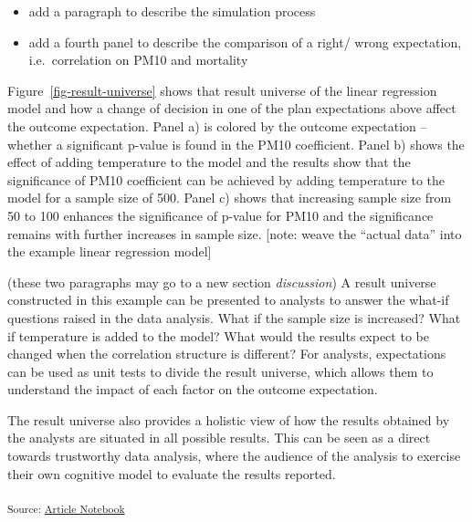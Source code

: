 \documentclass[
]{jds}
\begin{document}
\begin{itemize}
\item
  add a paragraph to describe the simulation process
\item
  add a fourth panel to describe the comparison of a right/ wrong
  expectation, i.e.~correlation on PM10 and mortality
\end{itemize}

Figure~\ref{fig-result-universe} shows that result universe of the
linear regression model and how a change of decision in one of the plan
expectations above affect the outcome expectation. Panel a) is colored
by the outcome expectation -- whether a significant p-value is found in
the PM10 coefficient. Panel b) shows the effect of adding temperature to
the model and the results show that the significance of PM10 coefficient
can be achieved by adding temperature to the model for a sample size of
500. Panel c) shows that increasing sample size from 50 to 100 enhances
the significance of p-value for PM10 and the significance remains with
further increases in sample size. {[}note: weave the ``actual data''
into the example linear regression model{]}

(these two paragraphs may go to a new section \emph{discussion}) A
result universe constructed in this example can be presented to analysts
to answer the what-if questions raised in the data analysis. What if the
sample size is increased? What if temperature is added to the model?
What would the results expect to be changed when the correlation
structure is different? For analysts, expectations can be used as unit
tests to divide the result universe, which allows them to understand the
impact of each factor on the outcome expectation.

The result universe also provides a holistic view of how the results
obtained by the analysts are situated in all possible results. This can
be seen as a direct towards trustworthy data analysis, where the
audience of the analysis to exercise their own cognitive model
\citep{grolemund_cognitive_2014} to evaluate the results reported.

\textsubscript{Source:
\href{https://huizezhang-sherry.github.io/paper-analysis-plan/index.qmd.html}{Article
Notebook}}
\end{document}
